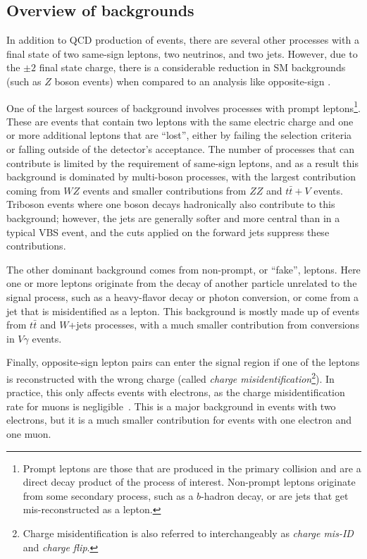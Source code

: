 \subsection{Overview of backgrounds}\label{ssww13tev:background_overview}
In addition to QCD production of \ssww events, there are several other processes with a final state of two same-sign leptons, two neutrinos, and two jets.
However, due to the $\pm 2$ final state charge, there is a considerable reduction in SM backgrounds (such as $Z$ boson events) when compared to an analysis like opposite-sign \oswwjj.

One of the largest sources of background involves processes with prompt leptons\footnote{Prompt leptons are those that are produced in the primary collision and are a direct decay product of the process of interest.  Non-prompt leptons originate from some secondary process, such as a $b$-hadron decay, or are jets that get mis-reconstructed as a lepton.}.
These are events that contain two leptons with the same electric charge and one or more additional leptons that are ``lost'', either by failing the selection criteria or falling outside of the detector's acceptance.
The number of processes that can contribute is limited by the requirement of same-sign leptons, and as a result this background is dominated by multi-boson processes, with the largest contribution coming from $WZ$ events and smaller contributions from $ZZ$ and $t\bar{t}+V$ events.
Triboson events where one boson decays hadronically also contribute to this background; however, the jets are generally softer and more central than in a typical VBS event, and the cuts applied on the forward jets suppress these contributions.

The other dominant background comes from non-prompt, or ``fake'', leptons.
Here one or more leptons originate from the decay of another particle unrelated to the signal process, such as a heavy-flavor decay or photon conversion, or come from a jet that is misidentified as a lepton.
This background is mostly made up of events from $t\bar{t}$ and $W$+jets processes, with a much smaller contribution from conversions in $V\gamma$ events. %

Finally, opposite-sign lepton pairs can enter the signal region if one of the leptons is reconstructed with the wrong charge (called \emph{charge misidentification}\footnote{Charge misidentification is also referred to interchangeably as \emph{charge mis-ID} and \emph{charge flip}.}).
In practice, this only affects events with electrons, as the charge misidentification rate for muons is negligible~\cite{2013.muon-flip}.
This is a major background in events with two electrons, but it is a much smaller contribution for events with one electron and one muon.

%
